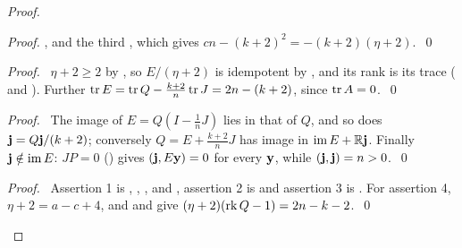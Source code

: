 \begin{proof}
\begin{proof}
  , and the third , which gives
  $cn-(k+2)^2=-(k+2)(\eta+2)$.~\qed\end{proof}
 \begin{proof}\pf\ $\eta+2\ge2$ by , so $E/(\eta+2)$ is idempotent by
  , and its rank is its trace ( and
  ). Further $\mathop{\mathrm{tr}}\nolimits E=\mathop{\mathrm{tr}}\nolimits Q-\frac{k+2}n\mathop{\mathrm{tr}}\nolimits J=2n-(k+2)$,
  since $\mathop{\mathrm{tr}}\nolimits A=0$.~\qed\end{proof}
 \begin{proof}\pf\ The image of $E=Q(I-\frac1nJ)$ lies in that of $Q$, and so does
  ${\mathbf j}=Q{\mathbf j}/(k+2)$; conversely $Q=E+\frac{k+2}nJ$ has image in $\mathop{\mathrm{im}}\nolimits E+{\mathbb R}{\mathbf j}$. Finally
  ${\mathbf j}\notin\mathop{\mathrm{im}}\nolimits E$: $JP=0$ () gives $({\mathbf j},E{\mathbf y})=0$ for every ${\mathbf y}$, while
  $({\mathbf j},{\mathbf j})=n>0$.~\qed\end{proof}
 \qedstep
 \begin{proof}\pf\ Assertion 1 is , , ,
   and , assertion 2 is  and assertion 3 is
  . For assertion 4, $\eta+2=a-c+4$, and  and
   give $(\eta+2)(\mathop{\mathrm{rk}}\nolimits Q-1)=2n-k-2$.~\qed\end{proof}
\end{proof}

